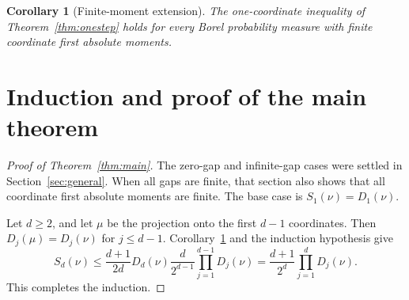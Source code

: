 \documentclass[11pt]{article}
\newtheorem{corollary}[theorem]{Corollary}
\theoremstyle{remark}
\begin{document}
\begin{aiblock}
\begin{corollary}[Finite-moment extension]
\label{cor:finite-moment}
The one-coordinate inequality of Theorem~\ref{thm:onestep} holds for every
Borel probability measure with finite coordinate first absolute moments.
\end{corollary}



\end{aiblock}
\section{Induction and proof of the main theorem}
\label{sec:induction}
\begin{aiblock}


\begin{proof}[Proof of Theorem~\ref{thm:main}]
The zero-gap and infinite-gap cases were settled in
Section~\ref{sec:general}. When all gaps are finite, that section also
shows that all coordinate first absolute moments are finite. The base
case is $S_1(\nu)=D_1(\nu)$.

Let $d\geq2$, and let $\mu$ be the projection onto the first $d-1$
coordinates. Then $D_j(\mu)=D_j(\nu)$ for $j\leq d-1$.
Corollary~\ref{cor:finite-moment} and the induction hypothesis give
\begin{equation}
S_d(\nu)\leq\frac{d+1}{2d}D_d(\nu)\frac{d}{2^{d-1}}\prod_{j=1}^{d-1}D_j(\nu)
=\frac{d+1}{2^d}\prod_{j=1}^dD_j(\nu).
\end{equation}
This completes the induction.
\end{proof}




\end{aiblock}
\end{document}
